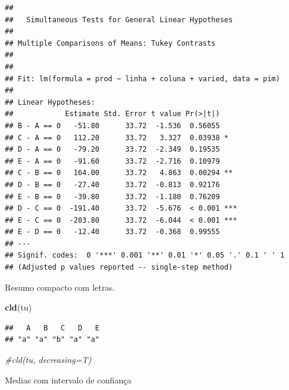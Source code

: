 \documentclass[
]{book}
\newenvironment{Shaded}{\begin{snugshade}}{\end{snugshade}}
\newcommand{\CommentTok}[1]{\textcolor[rgb]{0.56,0.35,0.01}{\textit{#1}}}
\newcommand{\DataTypeTok}[1]{\textcolor[rgb]{0.13,0.29,0.53}{#1}}
\newcommand{\KeywordTok}[1]{\textcolor[rgb]{0.13,0.29,0.53}{\textbf{#1}}}
\newcommand{\NormalTok}[1]{#1}
\newcommand{\OperatorTok}[1]{\textcolor[rgb]{0.81,0.36,0.00}{\textbf{#1}}}
\newcommand{\StringTok}[1]{\textcolor[rgb]{0.31,0.60,0.02}{#1}}
\begin{document}
\begin{verbatim}
## 
##   Simultaneous Tests for General Linear Hypotheses
## 
## Multiple Comparisons of Means: Tukey Contrasts
## 
## 
## Fit: lm(formula = prod ~ linha + coluna + varied, data = pim)
## 
## Linear Hypotheses:
##            Estimate Std. Error t value Pr(>|t|)    
## B - A == 0   -51.80      33.72  -1.536  0.56055    
## C - A == 0   112.20      33.72   3.327  0.03938 *  
## D - A == 0   -79.20      33.72  -2.349  0.19535    
## E - A == 0   -91.60      33.72  -2.716  0.10979    
## C - B == 0   164.00      33.72   4.863  0.00294 ** 
## D - B == 0   -27.40      33.72  -0.813  0.92176    
## E - B == 0   -39.80      33.72  -1.180  0.76209    
## D - C == 0  -191.40      33.72  -5.676  < 0.001 ***
## E - C == 0  -203.80      33.72  -6.044  < 0.001 ***
## E - D == 0   -12.40      33.72  -0.368  0.99555    
## ---
## Signif. codes:  0 '***' 0.001 '**' 0.01 '*' 0.05 '.' 0.1 ' ' 1
## (Adjusted p values reported -- single-step method)
\end{verbatim}

Resumo compacto com letras.

\begin{Shaded}
\begin{Highlighting}[]
\KeywordTok{cld}\NormalTok{(tu)}
\end{Highlighting}
\end{Shaded}

\begin{verbatim}
##   A   B   C   D   E 
## "a" "a" "b" "a" "a"
\end{verbatim}

\begin{Shaded}
\begin{Highlighting}[]
\CommentTok{#cld(tu, decreasing=T)}
\end{Highlighting}
\end{Shaded}

Medias com intervalo de confiança

\begin{Shaded}
\end{Shaded}
\end{document}
